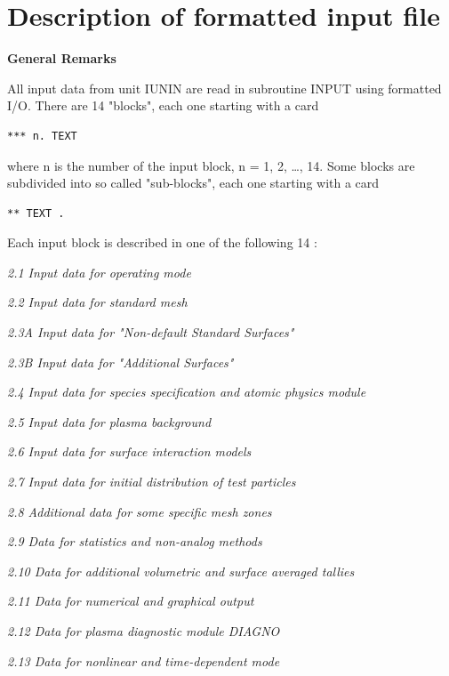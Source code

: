 \chapter{Description of formatted input file} \label{sec2}

\textbf{General Remarks} 

\medskip 

All input data from unit IUNIN are read in subroutine  INPUT using formatted
I/O.
There are 14 "blocks", each one starting with a card 

\begin{lstlisting}
*** n. TEXT
\end{lstlisting} 

where n is the number of the input block, n = 1, 2, \dots, 14.
Some blocks are subdivided into so called "sub-blocks", each one starting with
a card 

\begin{lstlisting}
** TEXT .
\end{lstlisting} 

Each input block is described in one of the following 14
:

\medskip

\textsl{2.1  Input data for operating mode}

\textsl{2.2  Input data for standard mesh}

\textsl{2.3A Input data for "Non-default Standard Surfaces"}

\textsl{2.3B Input data for "Additional Surfaces"}

\textsl{2.4  Input data for species specification and atomic physics module}

\textsl{2.5  Input data for plasma background}

\textsl{2.6  Input data for surface interaction models}

\textsl{2.7  Input data for initial distribution of test particles}

\textsl{2.8  Additional data for some specific mesh zones}

\textsl{2.9  Data for statistics and non-analog methods}

\textsl{2.10 Data for additional volumetric and surface averaged tallies}

\textsl{2.11 Data for numerical and graphical output}

\textsl{2.12 Data for plasma diagnostic module DIAGNO}

\textsl{2.13 Data for nonlinear and time-dependent mode}

